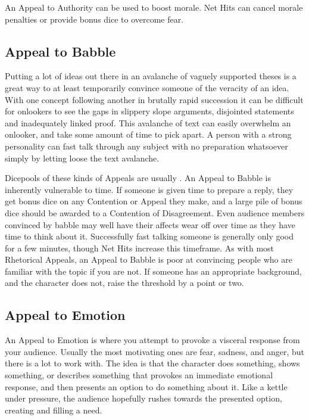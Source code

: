 An Appeal to Authority can be used to boost morale. Net Hits can cancel morale penalties or provide bonus dice to overcome fear.

\subsection{Appeal to Babble}

Putting a lot of ideas out there in an avalanche of vaguely supported theses is a great way to at least temporarily convince someone of the veracity of an idea. With one concept following another in brutally rapid succession it can be difficult for onlookers to see the gaps in slippery slope arguments, disjointed statements and inadequately linked proof. This avalanche of text can easily overwhelm an onlooker, and take some amount of time to pick apart. A person with a strong personality can fast talk through any subject with no preparation whatsoever simply by letting loose the text avalanche.

Dicepools of these kinds of Appeals are usually . An Appeal to Babble is inherently vulnerable to time. If someone is given time to prepare a reply, they get bonus dice on any Contention or Appeal they make, and a large pile of bonus dice should be awarded to a Contention of Disagreement. Even audience members convinced by babble may well have their affects wear off over time as they have time to think about it. Successfully fast talking someone is generally only good for a few minutes, though Net Hits increase this timeframe. As with most Rhetorical Appeals, an Appeal to Babble is poor at convincing people who are familiar with the topic if you are not. If someone has an appropriate background, and the character does not, raise the threshold by a point or two.

\subsection{Appeal to Emotion}

An Appeal to Emotion is where you attempt to provoke a visceral response from your audience. Usually the most motivating ones are fear, sadness, and anger, but there is a lot to work with. The idea is that the character does something, shows something, or describes something that provokes an immediate emotional response, and then presents an option to do something about it. Like a kettle under pressure, the audience hopefully rushes towards the presented option, creating and filling a need.

